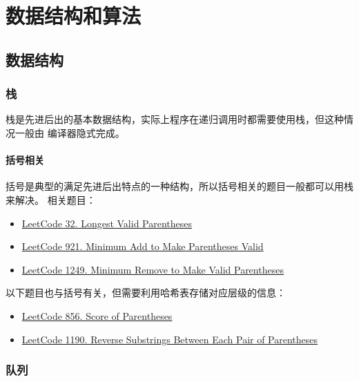 \part{数据结构和算法}

\chapter{数据结构}

\section{栈}
栈是先进后出的基本数据结构，实际上程序在递归调用时都需要使用栈，但这种情况一般由
编译器隐式完成。

\subsection{括号相关}
括号是典型的满足先进后出特点的一种结构，所以括号相关的题目一般都可以用栈来解决。
相关题目：


\begin{itemize}
  \item
    \href{https://leetcode.com/problems/longest-valid-parentheses/}{LeetCode 32. Longest Valid Parentheses}
  \item
    \href{https://leetcode.com/problems/minimum-add-to-make-parentheses-valid/}{LeetCode
      921. Minimum Add to Make Parentheses Valid}
  \item
    \href{https://leetcode.com/problems/minimum-remove-to-make-valid-parentheses/}{LeetCode
      1249. Minimum Remove to Make Valid Parentheses}
\end{itemize}

以下题目也与括号有关，但需要利用哈希表存储对应层级的信息：

\begin{itemize}
\item
  \href{https://leetcode.com/problems/score-of-parentheses/}{LeetCode 856. Score of Parentheses}
\item
  \href{https://leetcode.com/problems/reverse-substrings-between-each-pair-of-parentheses/}{LeetCode
    1190. Reverse Substrings Between Each Pair of Parentheses}
\end{itemize}

\section{队列}

